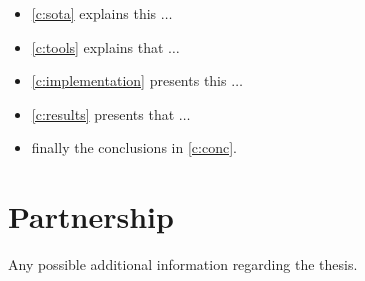 %
%
\begin{itemize}
\item \cref{c:sota} explains this $\ldots$
\item \cref{c:tools} explains that $\ldots$
\item \cref{c:implementation} presents this $\ldots$
\item \cref{c:results} presents that $\ldots$
\item finally the conclusions in \cref{c:conc}.
\end{itemize}

\section{Partnership}

Any possible additional information regarding the thesis.
